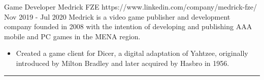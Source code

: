 \documentclass[a4paper]{article}
\begin{document}
\begin{minipage}[t]{0.65\textwidth}
{  \expheadingwithlink
    {Game Developer}
    {Medrick FZE}
    {https://www.linkedin.com/company/medrick-fze/}
    {Nov 2019 - Jul 2020}
    {Medrick is a video game publisher and development company founded in 2008 with the intention of developing and publishing AAA mobile and PC games in the MENA region.}

    \begin{itemize}[leftmargin=.5cm]
      \item \justifying\small Created a game client for Dicer, a digital adaptation of Yahtzee, originally introduced by Milton Bradley and later acquired by Hasbro in 1956.
    \end{itemize}
  }
\end{minipage}

\vspace{-1pt}
\rule{\textwidth}{1pt}
\end{document}
